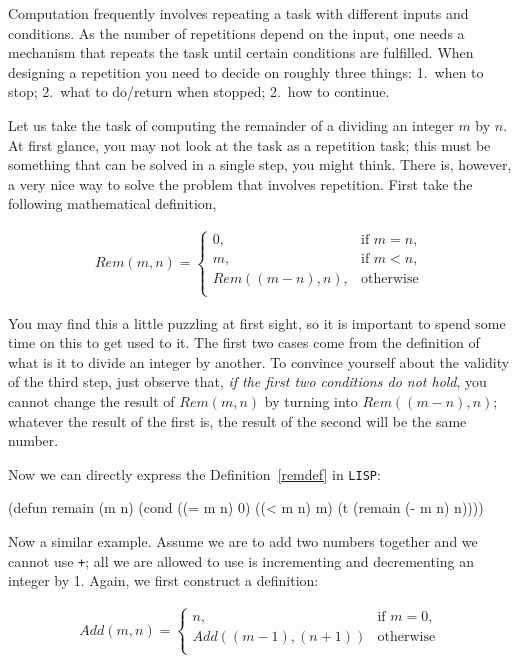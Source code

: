 \documentclass[a4paper,11pt]{article}
\begin{document}
\begin{uenum}
\item Computation frequently involves repeating a task with different inputs and conditions. As the number of repetitions depend on the input, one needs a mechanism that repeats the task until certain conditions are fulfilled. When designing a repetition you need to decide on roughly three things: 1.\ when to stop; 2.\ what to do/return when stopped; 2.\ how to continue.

Let us take the task of computing the remainder of a dividing an integer $m$ by $n$. At first glance, you may not look at the task as a repetition task; this must be something that can be solved in a single step, you might think. There is, however, a very nice way to solve the problem that involves repetition. First take the following mathematical definition, 

\begin{align}\label{remdef}
Rem(m,n) =  
\begin{cases}
0, & \text{if } m = n, \\
m, &  \text{if } m < n, \\
Rem((m-n),n), & \text{otherwise}\\
\end{cases}
\end{align}

You may find this a little puzzling at first sight, so it is important to spend some time on this to get used to it. The first two cases come from the definition of what is it to divide an integer by another. To convince yourself about the validity of the third step, just observe that, \emph{if the first two conditions do not hold}, you cannot change the result of $Rem(m,n)$ by turning into $Rem((m - n),n)$; whatever the result of the first is, the result of the second will be the same number.

Now we can directly express the Definition~\ref{remdef} in \Verb+LISP+:

\begin{lispcode}
(defun remain (m n)
  (cond ((= m n) 0)
        ((< m n) m)
        (t (remain (- m n) n))))
\end{lispcode}

\item Now a similar example. Assume we are to add two numbers together and we cannot use \Verb=+=; all we are allowed to use is incrementing and decrementing an integer by 1. Again, we first construct a definition:

\begin{align}
Add(m,n) =  
\begin{cases}
n, & \text{if } m = 0, \\
Add((m - 1),(n + 1)) & \text{otherwise}\\
\end{cases}
\end{align}


\end{uenum}
\end{document}
